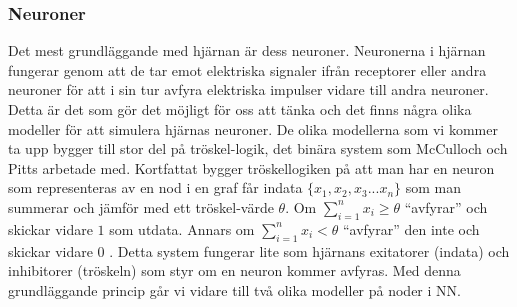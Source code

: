 \documentclass[a4paper,10pt]{article}
\begin{document}
\subsubsection{Neuroner}
Det mest grundläggande med hjärnan är dess neuroner. Neuronerna i hjärnan fungerar genom att de tar emot elektriska signaler ifrån receptorer eller andra neuroner för att i sin tur avfyra elektriska impulser vidare till andra neuroner. Detta är det som gör det möjligt för oss att tänka och det finns några olika modeller för att simulera hjärnas neuroner. De olika modellerna som vi kommer ta upp bygger till stor del på tröskel-logik, det binära system som McCulloch och Pitts arbetade med. Kortfattat bygger tröskellogiken på att man har en neuron som representeras av en nod i en graf får indata $ \{ x_1,x_2,x_3...x_n \} $ som man summerar och jämför med ett tröskel-värde
$\theta$. Om $ \sum_{i=1}^{n} x_i \geq \theta$ ``avfyrar'' och skickar vidare $1$ som utdata. Annars om $ \sum_{i=1}^{n} x_i < \theta$ ``avfyrar'' den inte och skickar vidare 
$0$ \autocite{Threshold}. Detta system fungerar lite som hjärnans exitatorer (indata) och inhibitorer (tröskeln) som styr om en neuron kommer avfyras. Med denna grundläggande princip går vi vidare till två olika modeller på noder i NN.
\end{document}
